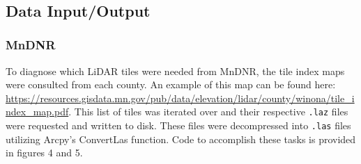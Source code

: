 \documentclass[article,12pt]{article}
\numberwithin{equation}{section}
\begin{document}
\\

\subsection{Data Input/Output}

\subsubsection{MnDNR}

To diagnose which LiDAR tiles were needed from MnDNR, the tile index maps were consulted from each county. An example of this map can be found here: \url{https://resources.gisdata.mn.gov/pub/data/elevation/lidar/county/winona/tile_index_map.pdf}. This list of tiles was iterated over and their respective \texttt{.laz} files were requested and written to disk. These files were decompressed into \texttt{.las} files utilizing Arcpy's ConvertLas function. Code to accomplish these tasks is provided in figures 4 and 5.

\begin{adjustwidth}{-.8in}{-.8in}
\begin{multicols}{2}
	\\
	\\
\end{multicols}
\end{adjustwidth}
\end{document}
